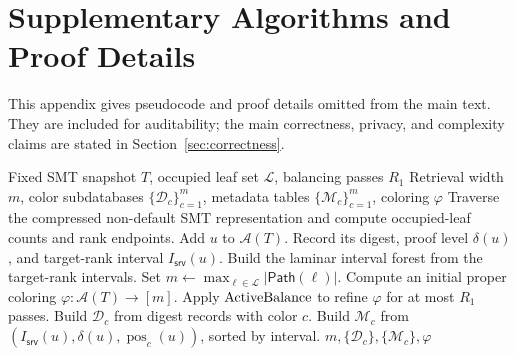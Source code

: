 \section{Supplementary Algorithms and Proof Details}
\label{app:proofs}

This appendix gives pseudocode and proof details omitted from the main text. They are included for auditability; the main correctness, privacy, and complexity claims are stated in Section~\ref{sec:correctness}.

\setcounter{algorithm}{0}
\renewcommand{\thealgorithm}{A.\arabic{algorithm}}

\begin{algorithm}[H]
\caption{Offline preprocessing}
\label{alg:app_setup}
\footnotesize
\begin{algorithmic}[1]
\Require Fixed SMT snapshot \(T\), occupied leaf set \(\mathcal{L}\), balancing passes \(R_1\)
\Ensure Retrieval width \(m\), color subdatabases \(\{\mathcal{D}_c\}_{c=1}^{m}\), metadata tables \(\{\mathcal{M}_c\}_{c=1}^{m}\), coloring \(\varphi\)
\State Traverse the compressed non-default SMT representation and compute occupied-leaf counts and rank endpoints.
        \State Add \(u\) to \(\mathcal{A}(T)\).
        \State Record its digest, proof level \(\delta(u)\), and target-rank interval \(I_{\mathsf{srv}}(u)\).
    \EndIf
\EndFor
\State Build the laminar interval forest from the target-rank intervals.
\State Set \(m\gets \max_{\ell\in\mathcal{L}}|\mathsf{Path}(\ell)|\).
\State Compute an initial proper coloring \(\varphi:\mathcal{A}(T)\rightarrow[m]\).
\State Apply \(\mbox{ActiveBalance}{}\) to refine \(\varphi\) for at most \(R_1\) passes.
    \State Build \(\mathcal{D}_c\) from digest records with color \(c\).
    \State Build \(\mathcal{M}_c\) from \((I_{\mathsf{srv}}(u),\delta(u),\operatorname{pos}_c(u))\), sorted by interval.
\EndFor
\State \Return \(m,\{\mathcal{D}_c\},\{\mathcal{M}_c\},\varphi\)
\end{algorithmic}
\end{algorithm}

